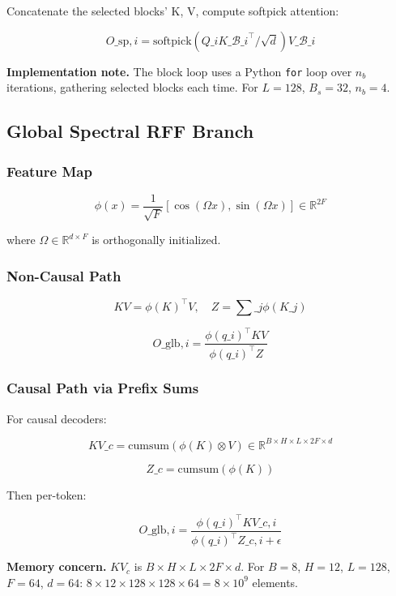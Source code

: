 Concatenate the selected blocks' K, V, compute softpick attention:

\[
O\_{\text{sp}, i} = \text{softpick}(Q\_i K\_{\mathcal{B}\_i}^\top / \sqrt{d}) V\_{\mathcal{B}\_i}
\tag{4.6}
\]

\textbf{Implementation note.} The block loop uses a Python \texttt{for} loop over 
$n_b$ iterations, gathering selected blocks each time. For $L = 128$, 
$B_s = 32$, $n_b = 4$.

\subsection{Global Spectral RFF Branch}

\subsubsection{Feature Map}

\[
\phi(x) = \frac{1}{\sqrt{F}} [\cos(\Omega x), \sin(\Omega x)] \in \mathbb{R}^{2F}
\tag{4.7}
\]

where $\Omega \in \mathbb{R}^{d \times F}$ is orthogonally initialized.

\subsubsection{Non-Causal Path}

\[
KV = \phi(K)^\top V, \quad Z = \sum\_j \phi(K\_j)
\tag{4.8}
\]

\[
O\_{\text{glb}, i} = \frac{\phi(q\_i)^\top KV}{\phi(q\_i)^\top Z}
\tag{4.9}
\]

\subsubsection{Causal Path via Prefix Sums}

For causal decoders:

\[
KV\_c = \text{cumsum}(\phi(K) \otimes V) \in \mathbb{R}^{B \times H \times L \times 2F \times d}
\tag{4.10}
\]

\[
Z\_c = \text{cumsum}(\phi(K))
\tag{4.11}
\]

Then per-token:

\[
O\_{\text{glb}, i} = \frac{\phi(q\_i)^\top KV\_{c,i}}{\phi(q\_i)^\top Z\_{c,i} + \epsilon}
\tag{4.12}
\]

\textbf{Memory concern.} $KV_c$ is $B \times H \times L \times 2F \times d$. For 
$B = 8$, $H = 12$, $L = 128$, $F = 64$, $d = 64$: 
$8 \times 12 \times 128 \times 128 \times 64 = 8 \times 10^9$ elements.

